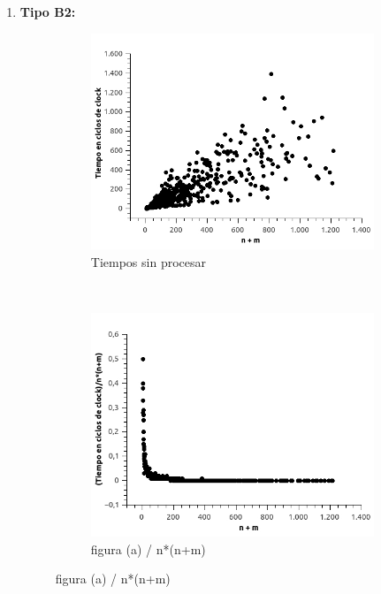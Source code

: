 \begin{enumerate}
\begin{figure}[H]
\end{figure}


\item \textbf{Tipo B2:}

\begin{figure}[H]
        \centering
        \begin{subfigure}[b]{0.5\textwidth}
                \includegraphics[width=\textwidth]{imagenes/ejer4-grafB2-1.jpg}
                \caption{Tiempos sin procesar}
        \end{subfigure}%
        ~ %
        \begin{subfigure}[b]{0.5\textwidth}
                \includegraphics[width=\textwidth]{imagenes/ejer4-grafB2-2.jpg}
                \caption{figura (a) / n*(n+m)}
        \end{subfigure}


\end{figure}
\end{enumerate}
